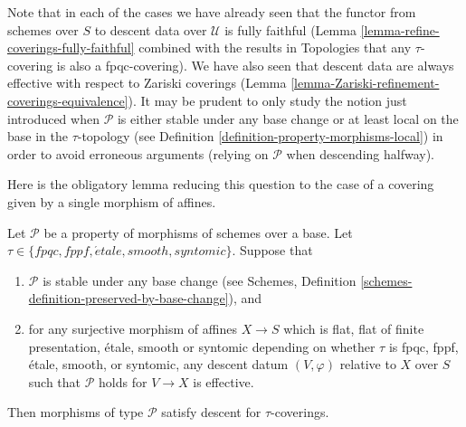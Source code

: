 \noindent
Note that in each of the cases we have already seen that
the functor from schemes over $S$ to descent data over
$\mathcal{U}$ is fully faithful
(Lemma \ref{lemma-refine-coverings-fully-faithful} combined
with the results in Topologies that any $\tau$-covering
is also a fpqc-covering).
We have also seen that descent data are always effective with
respect to Zariski coverings
(Lemma \ref{lemma-Zariski-refinement-coverings-equivalence}).
It may be prudent to only study the notion just introduced
when $\mathcal{P}$ is either stable under any base change or at least
local on the base in the $\tau$-topology
(see Definition \ref{definition-property-morphisms-local})
in order to avoid erroneous arguments (relying on $\mathcal{P}$
when descending halfway).

\medskip\noindent
Here is the obligatory lemma reducing this question
to the case of a covering given by a single morphism of affines.

\begin{lemma}
\label{lemma-descending-types-morphisms}
Let $\mathcal{P}$ be a property of morphisms of schemes over a base.
Let $\tau \in \{fpqc, fppf, \acute{e}tale, smooth, syntomic\}$.
Suppose that
\begin{enumerate}
\item $\mathcal{P}$ is stable under any base change
(see Schemes, Definition \ref{schemes-definition-preserved-by-base-change}),
and
\item for any surjective morphism of affines
$X \to S$ which is flat, flat of finite presentation,
\'etale, smooth or syntomic depending on whether $\tau$ is
fpqc, fppf, \'etale, smooth, or syntomic,
any descent datum $(V, \varphi)$ relative
to $X$ over $S$ such that $\mathcal{P}$ holds for
$V \to X$ is effective.
\end{enumerate}
Then morphisms of type $\mathcal{P}$ satisfy descent for $\tau$-coverings.
\end{lemma}

